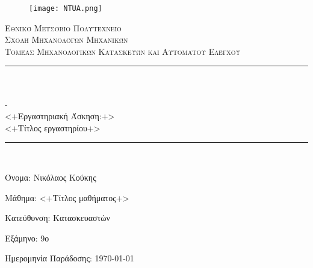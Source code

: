 \newcommand{\horrule}[1]{\rule{\linewidth}{#1}} %

\begin{titlepage}

\begin{center}
\begin{figure}[htpb]
    \begin{center}
        \texttt{[image: NTUA.png]} %
    \end{center}
\end{figure}

\normalfont \normalsize 
\textsc{Εθνικό Μετσόβιο Πολυτεχνείο} \\  %
\textsc{Σχολή Μηχανολόγων Μηχανικών} \\
\textsc{Τομέας Μηχανολογικών Κατασκευών και Αυτομάτου Ελέγχου} \\ [25pt] %
\horrule{0.5pt} \\[0.4cm] %
\\-\\ <+Εργαστηριακή Άσκηση:+>\\<+Τίτλος
εργαστηρίου+>
\horrule{2pt} \\[0.5cm] %
\vspace*{10mm}


\Large

\end{center}
\vfill
\large \normalfont
\begin{description*}
    \item[Όνομα:] Νικόλαος Κούκης
    \item[Mάθημα:] <+Τίτλος μαθήματος+>
    \item[Κατεύθυνση:] Κατασκευαστών
    \item[Εξάμηνο:] 9ο 
    \item[Ημερομηνία Παράδοσης:] \today
\end{description*}

\end{titlepage}

